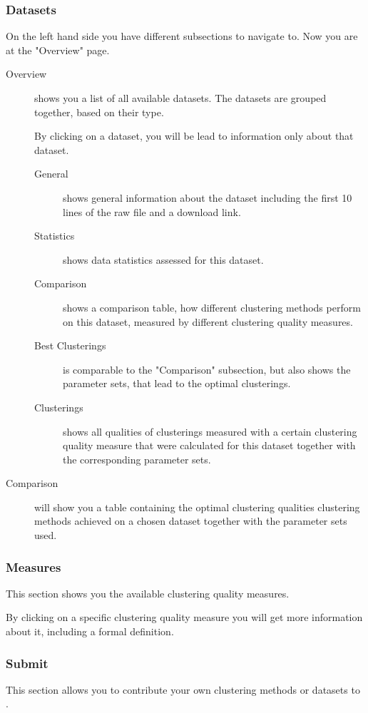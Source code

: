 	\subsubsection{Datasets}
	On the left hand side you have different subsections to navigate to. Now you are at the "Overview" page.
	\begin{description}
		\item[Overview] shows you a list of all available datasets. The datasets are grouped together, based on their type.
	
			By clicking on a dataset, you will be lead to information only about that dataset.
			\begin{description}
				\item[General] shows general information about the dataset including the first 10 lines of the raw file and a download link.
				\item[Statistics] shows data statistics assessed for this dataset.
				\item[Comparison] shows a comparison table, how different clustering methods perform on this dataset, measured by different clustering quality measures.
				\item[Best Clusterings] is comparable to the "Comparison" subsection, but also shows the parameter sets, that lead to the optimal clusterings.
				\item[Clusterings] shows all qualities of clusterings measured with a certain clustering quality measure that were calculated for this dataset together with the corresponding parameter sets.
			\end{description}
		\item[Comparison] will show you a table containing the optimal clustering qualities clustering methods achieved on a chosen dataset together with the parameter sets used.
	\end{description}
	\subsubsection{Measures} This section shows you the available clustering quality measures.
	
	By clicking on a specific clustering quality measure you will get more information about it, including a formal definition.
	\subsubsection{Submit} This section allows you to contribute your own clustering methods or datasets to \clusteval.
	
